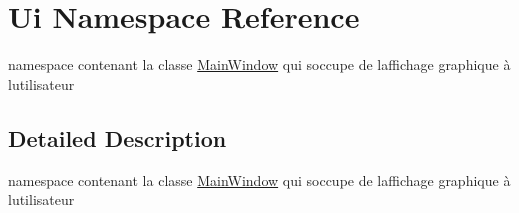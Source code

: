 \hypertarget{namespace_ui}{}\section{Ui Namespace Reference}
\label{namespace_ui}


namespace contenant la classe \hyperlink{class_main_window}{Main\+Window} qui s\textquotesingle{}occupe de l\textquotesingle{}affichage graphique à l\textquotesingle{}utilisateur  




\subsection{Detailed Description}
namespace contenant la classe \hyperlink{class_main_window}{Main\+Window} qui s\textquotesingle{}occupe de l\textquotesingle{}affichage graphique à l\textquotesingle{}utilisateur 